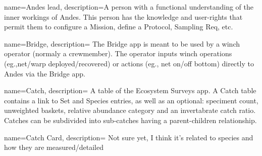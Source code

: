 \usepackage[nonumberlist,acronym,numberedsection]{glossaries}

\makenoidxglossaries

 {
  name=Andes lead,
  description={A person with a functional understanding of the inner workings of Andes.
   This person has the knowledge and user-rights that permit them to configure a \gls{Mission}, define a \gls{Protocol}, \gls{Sampling Req}, etc.}
}







 {
  name=Bridge,
  description={
    The Bridge app is meant to be used by a winch operator (normaly a crewmember).
    The operator inputs winch operations (eg.,net/warp deployed/recovered) or actions (eg., net on/off bottom) directly to Andes via the Bridge app.
  }
}

 {
  name=Catch,
  description={
    A table of the Ecosystem Surveys app. A Catch table contains a link to \gls{Set} and \gls{Species} entries, as well as an optional: speciment count, unweighted baskets, relative abundance category and an invertabrate catch ratio.
    Catches can be subdivided into sub-catches having a parent-children relationship.
  }
}

 {
  name=Catch Card,
  description={
    Not sure yet, I think it's related to species and how they are measured/detailed
  }
}

